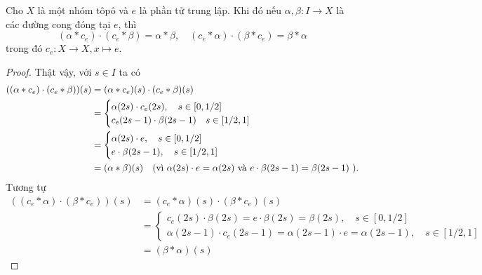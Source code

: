 \begin{lemma}\label{tich}
    Cho $X$ là một nhóm tôpô
    và $e$ là phần tử trung lập. Khi đó nếu $\alpha,\beta:I\to X$ là các đường cong đóng tại $e$, thì 
    \[(\alpha*c_e) \cdot (c_e*\beta) = \alpha*\beta,\quad (c_e*\alpha)\cdot (\beta*c_e)= \beta * \alpha\]
    trong đó $c_e:X\to X, x\mapsto e$.
\end{lemma}
\begin{proof}
    Thật vậy, với $s\in I$ ta có
    \begin{align*}
    ((\alpha*c_e) \cdot (c_e*\beta))(s)
    &=(\alpha*c_e)(s)\cdot (c_e*\beta)(s)\\
    &=\begin{cases}
        \alpha(2s)\cdot c_e(2s),\quad s\in [0,1/2]\\
        c_e(2s-1)\cdot \beta(2s-1)\quad s\in [1/2,1]
    \end{cases}\\
    & =\begin{cases}
      \alpha(2s)\cdot e,\quad s\in [0,1/2]\\
    	 e\cdot \beta(2s-1),\quad s\in [1/2,1]
    \end{cases}\\
    &= (\alpha*\beta)(s)\quad (\text{vì $\alpha(2s)\cdot e=\alpha(2s)$ và $ e\cdot \beta(2s-1)=\beta(2s-1)$ }).
    \end{align*}
    Tương tự
    \begin{align*}
    ((c_e*\alpha) \cdot (\beta*c_e))(s)
    &=(c_e*\alpha)(s)\cdot (\beta*c_e)(s)\\
    &=\begin{cases}
        c_e(2s)\cdot \beta(2s) =  e\cdot \beta(2s) = \beta(2s),\quad s\in [0,1/2]\\
        \alpha(2s-1)\cdot c_e(2s-1) =  \alpha(2s-1)\cdot e = \alpha(2s-1),\quad s\in [1/2,1]
    \end{cases}\\
    &= (\beta*\alpha)(s)
    \end{align*}
\end{proof}
